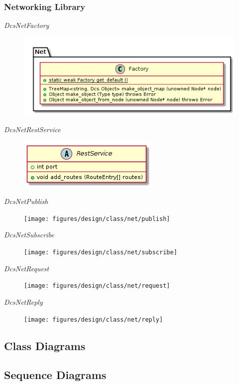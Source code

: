     \subsubsection{Networking Library}\label{sec:dsg-classes-net}

      \emph{DcsNetFactory}

        \begin{figure}[H]
          \includegraphics{figures/design/class/net/factory}
        \end{figure}

      \emph{DcsNetRestService}

        \begin{figure}[H]
          \includegraphics{figures/design/class/net/rest-service}
        \end{figure}

      \emph{DcsNetPublish}

        \begin{figure}[H]
          \texttt{[image: figures/design/class/net/publish]}
        \end{figure}

      \emph{DcsNetSubscribe}

        \begin{figure}[H]
          \texttt{[image: figures/design/class/net/subscribe]}
        \end{figure}

      \emph{DcsNetRequest}

        \begin{figure}[H]
          \texttt{[image: figures/design/class/net/request]}
        \end{figure}

      \emph{DcsNetReply}

        \begin{figure}[H]
          \texttt{[image: figures/design/class/net/reply]}
        \end{figure}

  \subsection{Class Diagrams}\label{sec:dsg-class-dia}

  \subsection{Sequence Diagrams}\label{sec:dsg-sequence}
